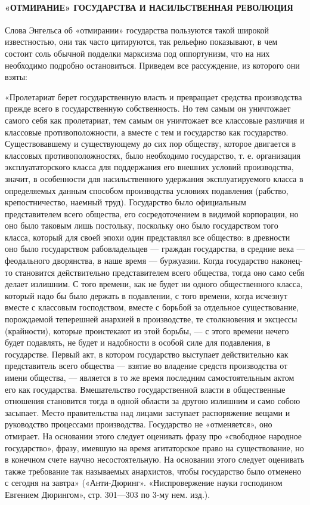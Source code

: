 \documentclass[12pt]{article}
\newcommand{\parnum}{(\arabic{parcount})}
\newcounter{parcount}
\newenvironment{parnumbers}{%
  \par%
  \everypar{\noindent \stepcounter{parcount}\marginpar[]{\parnum}}%
}{}
\begin{document}
\paragraph{«ОТМИРАНИЕ» ГОСУДАРСТВА И НАСИЛЬСТВЕННАЯ РЕВОЛЮЦИЯ}
\begin{parnumbers}
Слова Энгельса об «отмирании» государства пользуются такой широкой известностью, они так часто цитируются, так рельефно показывают, в чем состоит соль обычной подделки марксизма под оппортунизм, что на них необходимо подробно остановиться. Приведем все рассуждение, из которого они взяты:

«Пролетариат берет государственную власть и превращает средства производства прежде всего в государственную собственность. Но тем самым он уничтожает самого себя как пролетариат, тем самым он уничтожает все классовые различия и классовые противоположности, а вместе с тем и государство как государство. Существовавшему и существующему до сих пор обществу, которое двигается в классовых противоположностях, было необходимо государство, т. е. организация эксплуататорского класса для поддержания его внешних условий производства, значит, в особенности для насильственного удержания эксплуатируемого класса в определяемых данным способом производства условиях подавления (рабство, крепостничество, наемный труд). Государство было официальным представителем всего общества, его сосредоточением в видимой корпорации, но оно было таковым лишь постольку, поскольку оно было государством того класса, который для своей эпохи один представлял все общество: в древности оно было государством рабовладельцев — граждан государства, в средние века — феодального дворянства, в наше время — буржуазии. Когда государство наконец-то становится действительно представителем всего общества, тогда оно само себя делает излишним. С того времени, как не будет ни одного общественного класса, который надо бы было держать в подавлении, с того времени, когда исчезнут вместе с классовым господством, вместе с борьбой за отдельное существование, порождаемой теперешней анархией в производстве, те столкновения и эксцессы (крайности), которые проистекают из этой борьбы, — с этого времени нечего будет подавлять, не будет и надобности в особой силе для подавления, в государстве. Первый акт, в котором государство выступает действительно как представитель всего общества — взятие во владение средств производства от имени общества, — является в то же время последним самостоятельным актом его как государства. Вмешательство государственной власти в общественные отношения становится тогда в одной области за другою излишним и само собою засыпает. Место правительства над лицами заступает распоряжение вещами и руководство процессами производства. Государство не «отменяется», оно отмирает. На основании этого следует оценивать фразу про «свободное народное государство», фразу, имевшую на время агитаторское право на существование, но в конечном счете научно несостоятельную. На основании этого следует оценивать также требование так называемых анархистов, чтобы государство было отменено с сегодня на завтра» («Анти-Дюринг». «Ниспровержение науки господином Евгением Дюрингом», стр. 301—303 по 3-му нем. изд.).


\end{parnumbers}
\end{document}
